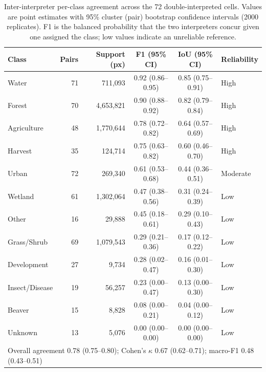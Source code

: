 \begin{table}[t]
\centering
\caption{Inter-interpreter per-class agreement across the 72 double-interpreted cells. Values are point estimates with 95\% cluster (pair) bootstrap confidence intervals (2000 replicates). F1 is the balanced probability that the two interpreters concur given one assigned the class; low values indicate an unreliable reference.}
\label{tab:interpreter_agreement}
\begin{tabular}{lrrccl}
\toprule
Class & Pairs & Support (px) & F1 (95\% CI) & IoU (95\% CI) & Reliability \\
\midrule
Water & 71 & 711,093 & 0.92 (0.86--0.95) & 0.85 (0.75--0.91) & High \\
Forest & 70 & 4,653,821 & 0.90 (0.88--0.92) & 0.82 (0.79--0.84) & High \\
Agriculture & 48 & 1,770,644 & 0.78 (0.72--0.82) & 0.64 (0.57--0.69) & High \\
Harvest & 35 & 124,714 & 0.75 (0.63--0.82) & 0.60 (0.46--0.70) & High \\
Urban & 72 & 269,340 & 0.61 (0.53--0.68) & 0.44 (0.36--0.51) & Moderate \\
Wetland & 61 & 1,302,064 & 0.47 (0.38--0.56) & 0.31 (0.24--0.39) & Low \\
Other & 16 & 29,888 & 0.45 (0.18--0.61) & 0.29 (0.10--0.43) & Low \\
Grass/Shrub & 69 & 1,079,543 & 0.29 (0.21--0.36) & 0.17 (0.12--0.22) & Low \\
Development & 27 & 9,734 & 0.28 (0.02--0.47) & 0.16 (0.01--0.30) & Low \\
Insect/Disease & 19 & 56,257 & 0.23 (0.00--0.47) & 0.13 (0.00--0.30) & Low \\
Beaver & 15 & 8,828 & 0.08 (0.00--0.21) & 0.04 (0.00--0.12) & Low \\
Unknown & 13 & 5,076 & 0.00 (0.00--0.00) & 0.00 (0.00--0.00) & Low \\
\midrule
\multicolumn{6}{l}{Overall agreement 0.78 (0.75--0.80); Cohen's $\kappa$ 0.67 (0.62--0.71); macro-F1 0.48 (0.43--0.51)} \\
\bottomrule
\end{tabular}
\end{table}
